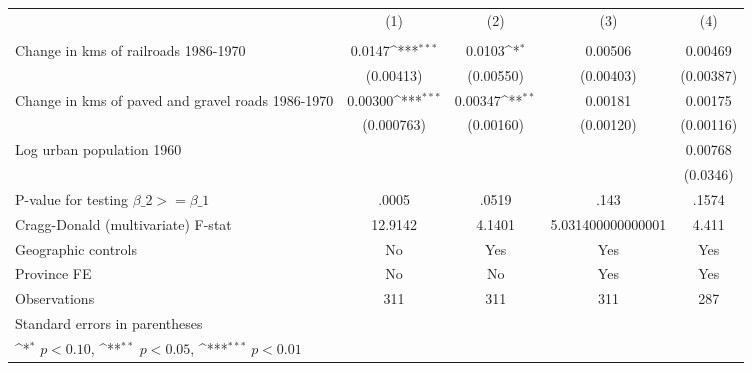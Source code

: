 {
\def\sym#1{\ifmmode^{#1}\else\(^{#1}\)\fi}
\begin{tabular}{l*{4}{c}}
\hline\hline
                &\multicolumn{1}{c}{(1)}&\multicolumn{1}{c}{(2)}&\multicolumn{1}{c}{(3)}&\multicolumn{1}{c}{(4)}\\
                &\multicolumn{1}{c}{}&\multicolumn{1}{c}{}&\multicolumn{1}{c}{}&\multicolumn{1}{c}{}\\
\hline
Change in kms of railroads 1986-1970&   0.0147\sym{***}&   0.0103\sym{*}  &  0.00506         &  0.00469         \\
                &(0.00413)         &(0.00550)         &(0.00403)         &(0.00387)         \\
[1em]
Change in kms of paved and gravel roads 1986-1970&  0.00300\sym{***}&  0.00347\sym{**} &  0.00181         &  0.00175         \\
                &(0.000763)         &(0.00160)         &(0.00120)         &(0.00116)         \\
[1em]
Log urban population 1960&                  &                  &                  &  0.00768         \\
                &                  &                  &                  & (0.0346)         \\
\hline
P-value for testing $\beta\_{2} >= \beta\_{1}$&    .0005         &    .0519         &     .143         &    .1574         \\
Cragg-Donald (multivariate) F-stat&  12.9142         &   4.1401         &5.031400000000001         &    4.411         \\
Geographic controls&       No         &      Yes         &      Yes         &      Yes         \\
Province FE     &       No         &       No         &      Yes         &      Yes         \\
Observations    &      311         &      311         &      311         &      287         \\
\hline\hline
\multicolumn{5}{l}{\footnotesize Standard errors in parentheses}\\
\multicolumn{5}{l}{\footnotesize \sym{*} \(p<0.10\), \sym{**} \(p<0.05\), \sym{***} \(p<0.01\)}\\
\end{tabular}
}
